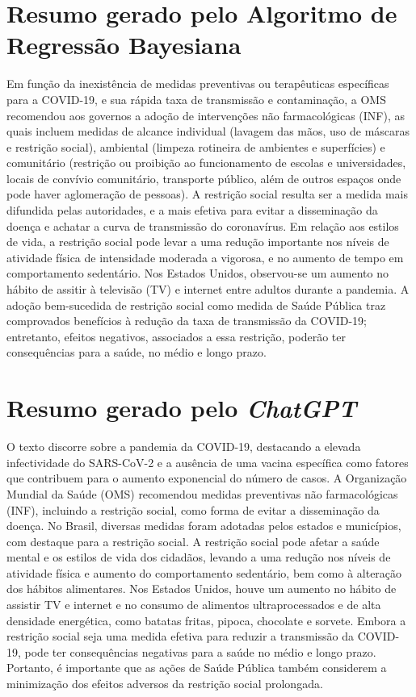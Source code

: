 \section{Resumo gerado pelo Algoritmo de Regressão Bayesiana}
\label{chap:bayesiana_resumo}
Em função da inexistência de medidas preventivas ou terapêuticas específicas para a COVID-19, e sua rápida taxa de transmissão e contaminação, a OMS recomendou aos governos a adoção de intervenções não farmacológicas (INF), as quais incluem medidas de alcance individual (lavagem das mãos, uso de máscaras e restrição social), ambiental (limpeza rotineira de ambientes e superfícies) e comunitário (restrição ou proibição ao funcionamento de escolas e universidades, locais de convívio comunitário, transporte público,
além de outros espaços onde pode haver aglomeração de pessoas). A restrição social resulta ser a medida mais difundida pelas autoridades, e a mais efetiva para evitar a disseminação da doença e achatar a curva de transmissão do coronavírus. Em relação aos estilos de vida, a restrição social pode levar a uma redução importante nos níveis de atividade física de intensidade moderada a vigorosa, e no aumento de tempo em comportamento sedentário. Nos Estados Unidos, observou-se um aumento no hábito de assitir à televisão (TV) e internet entre adultos durante a pandemia. A adoção bem-sucedida de restrição social como medida de Saúde Pública traz comprovados benefícios à redução da taxa de transmissão da COVID-19; entretanto, efeitos negativos, associados a essa restrição, poderão ter consequências para a saúde, no médio e longo prazo.

\section{Resumo gerado pelo \textit{ChatGPT}}
\label{chap:chatgpt_resumo}
O texto discorre sobre a pandemia da COVID-19, destacando a elevada infectividade do SARS-CoV-2 e a ausência de uma vacina específica como fatores que contribuem para o aumento exponencial do número de casos. A Organização Mundial da Saúde (OMS) recomendou medidas preventivas não farmacológicas (INF), incluindo a restrição social, como forma de evitar a disseminação da doença. No Brasil, diversas medidas foram adotadas pelos estados e municípios, com destaque para a restrição social.
A restrição social pode afetar a saúde mental e os estilos de vida dos cidadãos, levando a uma redução nos níveis de atividade física e aumento do comportamento sedentário, bem como à alteração dos hábitos alimentares. Nos Estados Unidos, houve um aumento no hábito de assistir TV e internet e no consumo de alimentos ultraprocessados e de alta densidade energética, como batatas fritas, pipoca, chocolate e sorvete.
Embora a restrição social seja uma medida efetiva para reduzir a transmissão da COVID-19, pode ter consequências negativas para a saúde no médio e longo prazo. Portanto, é importante que as ações de Saúde Pública também considerem a minimização dos efeitos adversos da restrição social prolongada.


